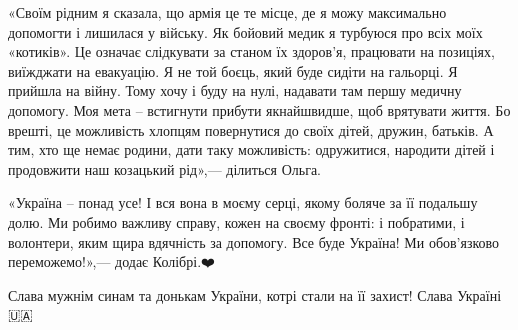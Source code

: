 
«Своїм рідним я сказала, що армія це те місце, де я можу максимально допомогти
і лишилася у війську. Як бойовий медик я турбуюся про всіх моїх «котиків». Це
означає слідкувати за станом їх здоров’я, працювати на позиціях, виїжджати на
евакуацію. Я не той боєць, який буде сидіти на гальорці. Я прийшла на війну.
Тому хочу і буду на нулі, надавати там першу медичну допомогу. Моя мета –
встигнути прибути якнайшвидше, щоб врятувати життя. Бо врешті, це можливість
хлопцям повернутися до своїх дітей, дружин, батьків. А тим, хто ще немає
родини, дати таку можливість: одружитися, народити дітей і продовжити наш
козацький рід»,— ділиться Ольга.🙏🏻


«Україна – понад усе! І вся вона в моєму серці, якому боляче за її подальшу
долю. Ми робимо важливу справу, кожен на своєму фронті: і побратими, і
волонтери, яким щира вдячність за допомогу. Все буде Україна! Ми обов’язково
переможемо!»,— додає Колібрі.❤️

Слава мужнім синам та донькам України, котрі стали на її захист! Слава
Україні🇺🇦


